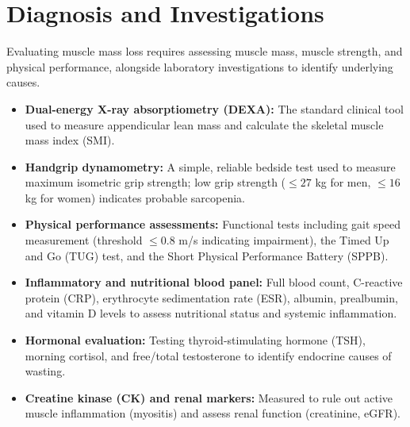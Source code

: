 \section*{Diagnosis and Investigations}
Evaluating muscle mass loss requires assessing muscle mass, muscle strength, and physical performance, alongside laboratory investigations to identify underlying causes.
\begin{itemize}
    \item \textbf{Dual-energy X-ray absorptiometry (DEXA):} The standard clinical tool used to measure appendicular lean mass and calculate the skeletal muscle mass index (SMI).
    \item \textbf{Handgrip dynamometry:} A simple, reliable bedside test used to measure maximum isometric grip strength; low grip strength ($\le 27$ kg for men, $\le 16$ kg for women) indicates probable sarcopenia.
    \item \textbf{Physical performance assessments:} Functional tests including gait speed measurement (threshold $\le 0.8$ m/s indicating impairment), the Timed Up and Go (TUG) test, and the Short Physical Performance Battery (SPPB).
    \item \textbf{Inflammatory and nutritional blood panel:} Full blood count, C-reactive protein (CRP), erythrocyte sedimentation rate (ESR), albumin, prealbumin, and vitamin D levels to assess nutritional status and systemic inflammation.
    \item \textbf{Hormonal evaluation:} Testing thyroid-stimulating hormone (TSH), morning cortisol, and free/total testosterone to identify endocrine causes of wasting.
    \item \textbf{Creatine kinase (CK) and renal markers:} Measured to rule out active muscle inflammation (myositis) and assess renal function (creatinine, eGFR).
\end{itemize}

